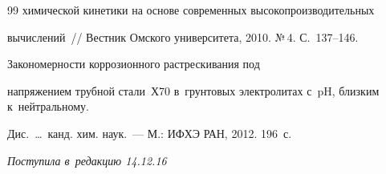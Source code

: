 {{\begin{thebibliography}{99}
химической кинетики на основе современных высокопроизводительных 


вычислений~/\!\!/ Вестник Омского университета, 2010. №\,4. С.~137--146.




 Закономерности коррозионного растрескивания под 


напряжением трубной стали~Х70 в~грунтовых электролитах с~pH, близким к~нейтральному.\linebreak 


Дис.\ \ldots\ канд. хим. наук.~--- М.: ИФХЭ РАН, 2012. 196~с.


        \end{thebibliography}


} }








\vspace*{-3pt}





\hfill{\small\textit{Поступила в~редакцию 14.12.16}}





























\newpage





\vspace*{-28pt}





















